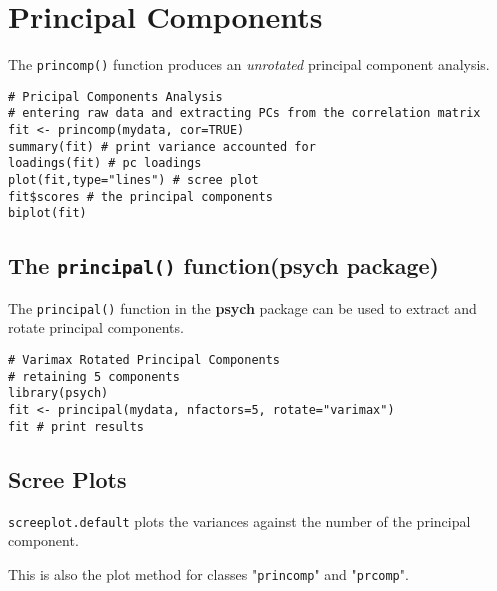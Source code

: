 \documentclass[a4paper,12pt]{article}
\begin{document}
\section{Principal Components}

The \texttt{princomp()} function produces an \textit{unrotated} principal component analysis.

\begin{framed}
\begin{verbatim}
# Pricipal Components Analysis
# entering raw data and extracting PCs from the correlation matrix 
fit <- princomp(mydata, cor=TRUE)
summary(fit) # print variance accounted for 
loadings(fit) # pc loadings 
plot(fit,type="lines") # scree plot 
fit$scores # the principal components
biplot(fit)
\end{verbatim}
\end{framed}

\subsection{The \texttt{principal()} function(psych package) }
The \texttt{principal()} function in the \textbf{psych }package can be used to extract and rotate principal components.
\begin{framed}
\begin{verbatim}
# Varimax Rotated Principal Components
# retaining 5 components 
library(psych)
fit <- principal(mydata, nfactors=5, rotate="varimax")
fit # print results
\end{verbatim}
\end{framed}
\subsection{Scree Plots}
\texttt{screeplot.default} plots the variances against the number of the principal component. 

This is also the plot method for classes "\texttt{princomp}" and "\texttt{prcomp}".
\end{document}
